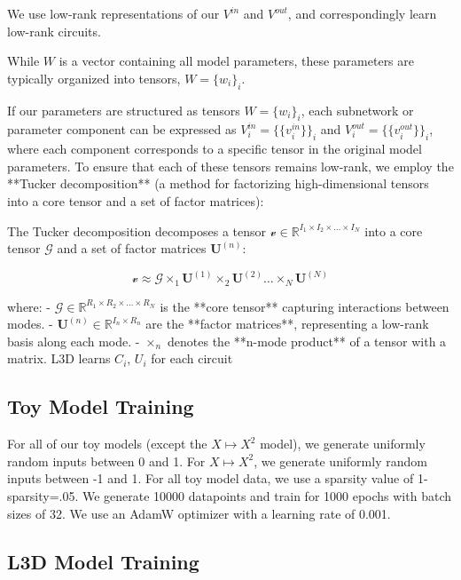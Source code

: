 \documentclass{article}
\theoremstyle{plain}
\theoremstyle{definition}
\theoremstyle{remark}
\begin{document}
We use low-rank representations of our $V^{in}$ and $V^{out}$, and correspondingly learn low-rank circuits.

While $W$ is a vector containing all model parameters, these parameters are typically organized into tensors, $W=\{w_i\}_i$.

If our parameters are structured as tensors $W = \{w_i\}_i$, each subnetwork or parameter component can be expressed as $V^{in}_i = \{\{v^{in}_i\}\}_i$ and $V^{out}_i = \{\{v^{out}_i\}\}_i$, where each component corresponds to a specific tensor in the original model parameters. To ensure that each of these tensors remains low-rank, we employ the **Tucker decomposition** \cite{tucker1966some} (a method for factorizing high-dimensional tensors into a core tensor and a set of factor matrices):

The Tucker decomposition decomposes a tensor \( \mathcal{v} \in \mathbb{R}^{I_1 \times I_2 \times \dots \times I_N} \) into a core tensor \( \mathcal{G} \) and a set of factor matrices \( \mathbf{U}^{(n)} \):

\begin{equation}
    \mathcal{v} \approx \mathcal{G} \times_1 \mathbf{U}^{(1)} \times_2 \mathbf{U}^{(2)} \dots \times_N \mathbf{U}^{(N)}
\end{equation}

where:
- \( \mathcal{G} \in \mathbb{R}^{R_1 \times R_2 \times \dots \times R_N} \) is the **core tensor** capturing interactions between modes.
- \( \mathbf{U}^{(n)} \in \mathbb{R}^{I_n \times R_n} \) are the **factor matrices**, representing a low-rank basis along each mode.
- \( \times_n \) denotes the **n-mode product** of a tensor with a matrix.
L3D learns $C_i$, {$U_i$} for each circuit


\subsection{Toy Model Training}\label{sec:toymodel_hyperparams}

For all of our toy models (except the $X \mapsto X^2$ model), we generate uniformly random inputs between 0 and 1. For $X \mapsto X^2$, we generate uniformly random inputs between -1 and 1. For all toy model data, we use a sparsity value of 1-sparsity=.05. We generate 10000 datapoints and train for 1000 epochs with batch sizes of 32. We use an AdamW optimizer with a learning rate of 0.001. 

\subsection{L3D Model Training}\label{sec:L3D_hyperparams}
\end{document}
